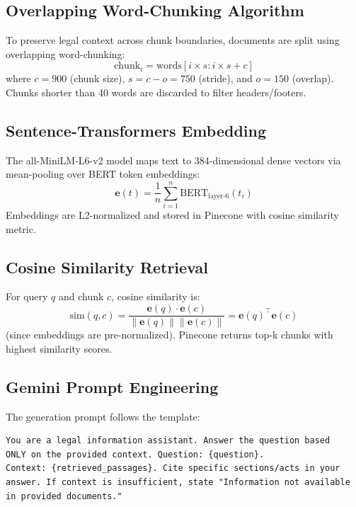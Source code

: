 \documentclass[12pt,a4paper]{report}
\begin{document}
\subsection{Overlapping Word-Chunking Algorithm}
To preserve legal context across chunk boundaries, documents are split using overlapping word-chunking:
\begin{equation}
    \text{chunk}_i = \text{words}[i \times s : i \times s + c]
\end{equation}
where $c = 900$ (chunk size), $s = c - o = 750$ (stride), and $o = 150$ (overlap). Chunks shorter than 40 words are discarded to filter headers/footers.

\subsection{Sentence-Transformers Embedding}
The all-MiniLM-L6-v2 model maps text to 384-dimensional dense vectors via mean-pooling over BERT token embeddings:
\begin{equation}
    \mathbf{e}(t) = \frac{1}{n} \sum_{i=1}^n \text{BERT}_{\text{layer-6}}(t_i)
\end{equation}
Embeddings are L2-normalized and stored in Pinecone with cosine similarity metric.

\subsection{Cosine Similarity Retrieval}
For query $q$ and chunk $c$, cosine similarity is:
\begin{equation}
    \text{sim}(q, c) = \frac{\mathbf{e}(q) \cdot \mathbf{e}(c)}{\|\mathbf{e}(q)\| \|\mathbf{e}(c)\|} = \mathbf{e}(q)^\top \mathbf{e}(c)
\end{equation}
(since embeddings are pre-normalized). Pinecone returns top-k chunks with highest similarity scores.

\subsection{Gemini Prompt Engineering}
The generation prompt follows the template:
\begin{verbatim}
You are a legal information assistant. Answer the question based 
ONLY on the provided context. Question: {question}. 
Context: {retrieved_passages}. Cite specific sections/acts in your 
answer. If context is insufficient, state "Information not available 
in provided documents."
\end{verbatim}
\end{document}
